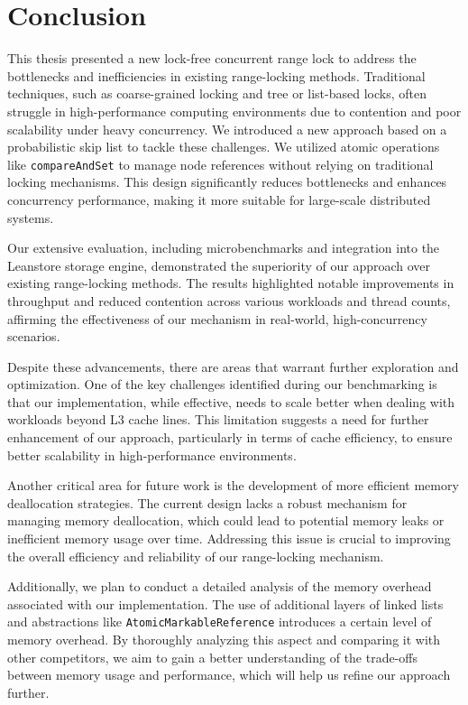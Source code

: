\chapter{Conclusion}\label{chapter}

This thesis presented a new lock-free concurrent range lock to address the bottlenecks and inefficiencies in existing range-locking methods. Traditional techniques, such as coarse-grained locking and tree or list-based locks, often struggle in high-performance computing environments due to contention and poor scalability under heavy concurrency. We introduced a new approach based on a probabilistic skip list to tackle these challenges. We utilized atomic operations like \texttt{compareAndSet} to manage node references without relying on traditional locking mechanisms. This design significantly reduces bottlenecks and enhances concurrency performance, making it more suitable for large-scale distributed systems.

Our extensive evaluation, including microbenchmarks and integration into the Leanstore storage engine, demonstrated the superiority of our approach over existing range-locking methods. The results highlighted notable improvements in throughput and reduced contention across various workloads and thread counts, affirming the effectiveness of our mechanism in real-world, high-concurrency scenarios.

Despite these advancements, there are areas that warrant further exploration and optimization. One of the key challenges identified during our benchmarking is that our implementation, while effective, needs to scale better when dealing with workloads beyond L3 cache lines. This limitation suggests a need for further enhancement of our approach, particularly in terms of cache efficiency, to ensure better scalability in high-performance environments.

Another critical area for future work is the development of more efficient memory deallocation strategies. The current design lacks a robust mechanism for managing memory deallocation, which could lead to potential memory leaks or inefficient memory usage over time. Addressing this issue is crucial to improving the overall efficiency and reliability of our range-locking mechanism.

Additionally, we plan to conduct a detailed analysis of the memory overhead associated with our implementation. The use of additional layers of linked lists and abstractions like \texttt{AtomicMarkableReference} introduces a certain level of memory overhead. By thoroughly analyzing this aspect and comparing it with other competitors, we aim to gain a better understanding of the trade-offs between memory usage and performance, which will help us refine our approach further.

